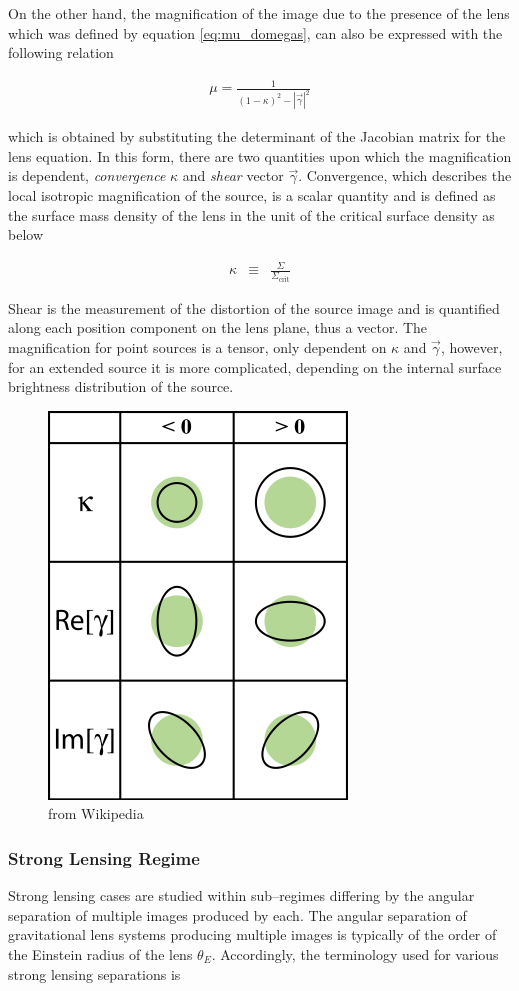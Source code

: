 \documentclass[paper=a4, fontsize=11pt]{scrartcl} %
\numberwithin{equation}{section} %
\numberwithin{figure}{section} %
\numberwithin{table}{section} %
\begin{document}
On the other hand, the magnification of the image due to the presence of the lens which was defined by equation \ref{eq:mu_domegas}, can also be expressed with the following relation 

 \begin{eqnarray}
 \label{eq:mu_kappa_gamma}
 \mu = \frac{1}{(1 - \kappa)^2 - |\vec{\gamma}|^2}
 \end{eqnarray}

 which is obtained by substituting the determinant of the Jacobian matrix for the lens equation. In this form, there are two quantities upon which the magnification is dependent, \emph{convergence} $\kappa$ and \emph{shear} vector $\vec{\gamma}$. Convergence, which describes the local isotropic magnification of the source, is a scalar quantity and is defined as the surface mass density of the lens in the unit of the critical surface density as below

 \begin{eqnarray}
 \label{eq:convergence}
 \kappa &\equiv& \frac{\Sigma}{\Sigma_{\mathrm{crit}}}
 \end{eqnarray}

 Shear is the measurement of the distortion of the source image and is quantified along each position component on the lens plane, thus a vector. The magnification for point sources is a tensor, only dependent on $\kappa$ and $\vec{\gamma}$, however, for an extended source it is more complicated, depending on the internal surface brightness distribution of the source.

\begin{figure}
  \centering
  \label{fig:shear_convergence}
  \includegraphics[width=0.3\columnwidth]{figs/shear_convergence}
  \caption{from Wikipedia} %
\end{figure}

   \subsubsection{Strong Lensing Regime}
Strong lensing cases are studied within sub--regimes differing by the angular separation of multiple images produced by each. The angular separation of gravitational lens systems producing multiple images is typically of the order of the Einstein radius of the lens $\theta_E$. Accordingly, the terminology used for various strong lensing separations is
\end{document}
